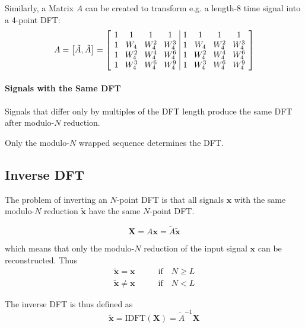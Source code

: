 Similarly, a Matrix $A$ can be created to transform e.g. a length-8 time signal
into a 4-point DFT:
\begingroup
\begin{equation*}
	\setlength\arraycolsep{4pt}
	A = \left[\tilde{A},\tilde{A}\right] = \left[ \begin{array}{cccc|cccc}
		1 & 1 & 1 & 1 & 1 & 1 & 1 & 1 \\
		1& W_4& W_4^2& W_4^3 & 1& W_4& W_4^2& W_4^3 \\
		1& W_4^2& W_4^4& W_4^6 & 1& W_4^2& W_4^4& W_4^6 \\
		1& W_4^3& W_4^6& W_4^9 & 1& W_4^3& W_4^6& W_4^9 \\
	\end{array} \right]
\end{equation*}
\endgroup

\paragraph{Signals with the Same DFT}

Signals that differ only by multiples of the DFT length produce the same
DFT after modulo-\(N\) reduction.

Only the modulo-\(N\) wrapped sequence determines the DFT.

\subsection{Inverse DFT}
The problem of inverting an $N$-point DFT is that all signals $\mathbf{x}$
with the same modulo-$N$ reduction $\tilde{\mathbf{x}}$ have the same
$N$-point DFT.

\begin{equation*}
	\mathbf{X} = A \mathbf{x} = \tilde{A} \tilde{\mathbf{x}}
\end{equation*}

which means that only the modulo-$N$ reduction of the input signal $\mathbf{x}$
can be reconstructed. Thus
\begin{align*}
	\tilde{\mathbf{x}} = \mathbf{x} \qquad & \text{if} \quad N \geq L \\
	\tilde{\mathbf{x}} \neq \mathbf{x} \qquad & \text{if} \quad N < L
\end{align*}

The inverse DFT is thus defined as
\begin{equation*}
	\tilde{\mathbf{x}} = \text{IDFT}(\mathbf{X}) = \tilde{A}^{-1} \mathbf{X}
\end{equation*}

